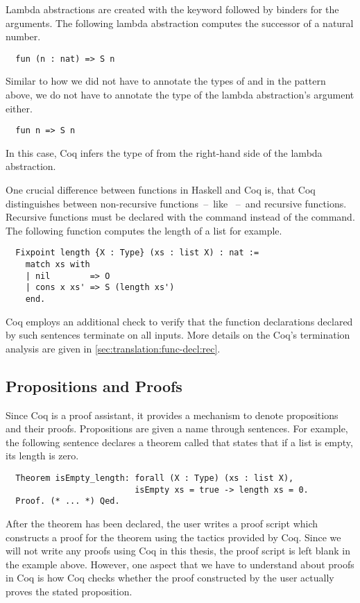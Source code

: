 Lambda abstractions are created with the  keyword followed by binders for the arguments.
The following lambda abstraction computes the successor of a natural number.
\begin{verbatim}
  fun (n : nat) => S n
\end{verbatim}
Similar to how we did not have to annotate the types of  and  in the pattern  above, we do not have to annotate the type of the lambda abstraction's argument either.
\begin{verbatim}
  fun n => S n
\end{verbatim}
In this case, Coq infers the type of  from the right-hand side of the lambda abstraction.

One crucial difference between functions in Haskell and Coq is, that Coq distinguishes between non-recursive functions~--~like ~--~and recursive functions.
Recursive functions must be declared with the  command instead of the  command.
The following function computes the length of a list for example.
\begin{verbatim}
  Fixpoint length {X : Type} (xs : list X) : nat :=
    match xs with
    | nil        => O
    | cons x xs' => S (length xs')
    end.
\end{verbatim}
Coq employs an additional check to verify that the function declarations declared by such  sentences terminate on all inputs.
More details on the Coq's termination analysis are given in \autoref{sec:translation:func-decl:rec}.

\subsection{Propositions and Proofs} \label{sec:preliminaries:coq:theorems}
Since Coq is a proof assistant, it provides a mechanism to denote propositions and their proofs.
Propositions are given a name through  sentences.
For example, the following sentence declares a theorem called  that states that if a list is empty, its length is zero.
\begin{verbatim}
  Theorem isEmpty_length: forall (X : Type) (xs : list X),
                          isEmpty xs = true -> length xs = 0.
  Proof. (* ... *) Qed.
\end{verbatim}
After the theorem has been declared, the user writes a proof script which constructs a proof for the theorem using the tactics provided by Coq.
Since we will not write any proofs using Coq in this thesis, the proof script is left blank in the example above.
However, one aspect that we have to understand about proofs in Coq is how Coq checks whether the proof constructed by the user actually proves the stated proposition.

